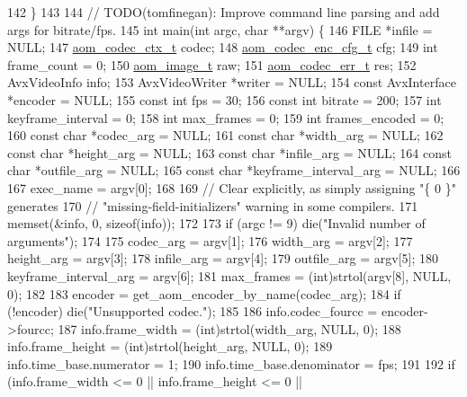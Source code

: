 \begin{DoxyCodeInclude}
{142 \}
143 
144 \textcolor{comment}{// TODO(tomfinegan): Improve command line parsing and add args for bitrate/fps.}
145 \textcolor{keywordtype}{int} main(\textcolor{keywordtype}{int} argc, \textcolor{keywordtype}{char} **argv) \{
146   FILE *infile = NULL;
147   \hyperlink{structaom__codec__ctx}{aom\_codec\_ctx\_t} codec;
148   \hyperlink{structaom__codec__enc__cfg}{aom\_codec\_enc\_cfg\_t} cfg;
149   \textcolor{keywordtype}{int} frame\_count = 0;
150   \hyperlink{structaom__image}{aom\_image\_t} raw;
151   \hyperlink{group__codec_gaaae61e0f8663e6137f1e228757248e7c}{aom\_codec\_err\_t} res;
152   AvxVideoInfo info;
153   AvxVideoWriter *writer = NULL;
154   \textcolor{keyword}{const} AvxInterface *encoder = NULL;
155   \textcolor{keyword}{const} \textcolor{keywordtype}{int} fps = 30;
156   \textcolor{keyword}{const} \textcolor{keywordtype}{int} bitrate = 200;
157   \textcolor{keywordtype}{int} keyframe\_interval = 0;
158   \textcolor{keywordtype}{int} max\_frames = 0;
159   \textcolor{keywordtype}{int} frames\_encoded = 0;
160   \textcolor{keyword}{const} \textcolor{keywordtype}{char} *codec\_arg = NULL;
161   \textcolor{keyword}{const} \textcolor{keywordtype}{char} *width\_arg = NULL;
162   \textcolor{keyword}{const} \textcolor{keywordtype}{char} *height\_arg = NULL;
163   \textcolor{keyword}{const} \textcolor{keywordtype}{char} *infile\_arg = NULL;
164   \textcolor{keyword}{const} \textcolor{keywordtype}{char} *outfile\_arg = NULL;
165   \textcolor{keyword}{const} \textcolor{keywordtype}{char} *keyframe\_interval\_arg = NULL;
166 
167   exec\_name = argv[0];
168 
169   \textcolor{comment}{// Clear explicitly, as simply assigning "\{ 0 \}" generates}
170   \textcolor{comment}{// "missing-field-initializers" warning in some compilers.}
171   memset(&info, 0, \textcolor{keyword}{sizeof}(info));
172 
173   \textcolor{keywordflow}{if} (argc != 9) die(\textcolor{stringliteral}{"Invalid number of arguments"});
174 
175   codec\_arg = argv[1];
176   width\_arg = argv[2];
177   height\_arg = argv[3];
178   infile\_arg = argv[4];
179   outfile\_arg = argv[5];
180   keyframe\_interval\_arg = argv[6];
181   max\_frames = (int)strtol(argv[8], NULL, 0);
182 
183   encoder = get\_aom\_encoder\_by\_name(codec\_arg);
184   \textcolor{keywordflow}{if} (!encoder) die(\textcolor{stringliteral}{"Unsupported codec."});
185 
186   info.codec\_fourcc = encoder->fourcc;
187   info.frame\_width = (int)strtol(width\_arg, NULL, 0);
188   info.frame\_height = (int)strtol(height\_arg, NULL, 0);
189   info.time\_base.numerator = 1;
190   info.time\_base.denominator = fps;
191 
192   \textcolor{keywordflow}{if} (info.frame\_width <= 0 || info.frame\_height <= 0 ||
}
\end{DoxyCodeInclude}
